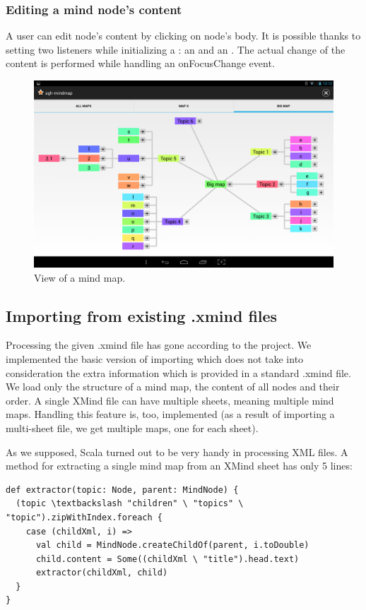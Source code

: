 \subsubsection{Editing a mind node's content}
\label{subsubsec:edit-node}
A user can edit node's content by clicking on node's body. It is possible thanks to setting two listeners while initializing a : an  and an . The actual change of the content is performed while handling an onFocusChange event.

\begin{figure}[h]
	\centering
	\includegraphics[width=\textwidth]{graphics-screenshot-big-map}
	\caption{View of a mind map.}
	\label{fig:screen-map}
\end{figure}

\subsection{Importing from existing .xmind files}
\label{subsec:import}
Processing the given .xmind file has gone according to the project. We implemented the basic version of importing which does not take into consideration the extra information which is provided in a standard .xmind file. We load only the structure of a mind map, the content of all nodes and their order. A single XMind file can have multiple sheets, meaning multiple mind maps. Handling this feature is, too, implemented (as a result of importing a multi-sheet file, we get multiple maps, one for each sheet).

As we supposed, Scala turned out to be very handy in processing XML files. A method for extracting a single mind map from an XMind sheet has only 5 lines:
\begin{verbatim}
def extractor(topic: Node, parent: MindNode) {
  (topic \textbackslash "children" \ "topics" \ "topic").zipWithIndex.foreach {
    case (childXml, i) =>
      val child = MindNode.createChildOf(parent, i.toDouble)
      child.content = Some((childXml \ "title").head.text)
      extractor(childXml, child)
  }
}\end{verbatim}

